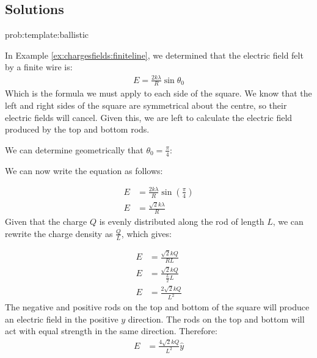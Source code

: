\subsection{Solutions}
\begin{solution}{prob:template:ballistic}\label{soln:template:ballistic}

In Example \ref{ex:chargesfields:finiteline}, we determined that the electric field felt by a finite wire is:
\begin{align*}
E = \frac{2k\lambda}{R}\sin\theta_0
\end{align*}
Which is the formula we must apply to each side of the square. We know that the left and right sides of the square are symmetrical about the centre, so their electric fields will cancel. Given this, we are left to calculate the electric field produced by the top and bottom rods.

We can determine geometrically that $\theta_0 = \frac{\pi}{4}$:


We can now write the equation as follows:

\begin{align*}
E& = \frac{2k\lambda}{R}\sin(\frac{\pi}{4})\\
E &= \frac{\sqrt{2}k\lambda}{R}
\end{align*}
Given that the charge $Q$ is evenly distributed along the rod of length $L$, we can rewrite the charge density as $\frac{Q}{L}$, which gives:

\begin{align*}
E& = \frac{\sqrt{2}k Q}{RL}\\
E& = \frac{\sqrt{2}k Q}{\frac{L}{2}L}\\
E& = \frac{2\sqrt{2}k Q}{L^2}
\end{align*}
The negative and positive rods on the top and bottom of the square will produce an electric field in the positive $y$ direction. The rods on the top and bottom will act with equal strength in the same direction. Therefore:
\begin{align*}
	E&=\frac{4\sqrt{2}kQ}{L^2} \hat y
\end{align*}
\end{solution}


